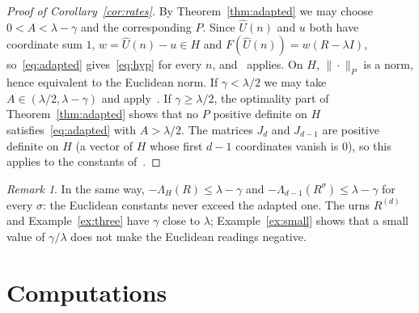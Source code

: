 \documentclass[11pt]{amsart}
\theoremstyle{definition}
\theoremstyle{remark}
\newtheorem{remark}[theorem]{Remark}
\begin{document}
\begin{proof}[Proof of Corollary~\ref{cor:rates}]
By Theorem~\ref{thm:adapted} we may choose $0<A<\lambda-\gamma$ and the corresponding $P$. Since $\widehat U(n)$ and $u$ both have coordinate sum $1$, $w=\widehat U(n)-u\in H$ and $F(\widehat U(n))=w(R-\lambda I)$, so~\eqref{eq:adapted} gives~\eqref{eq:hyp} for every $n$, and~\cite[Theorem~3.2]{NP} applies. On $H$, $\|\cdot\|_P$ is a norm, hence equivalent to the Euclidean norm. If $\gamma<\lambda/2$ we may take $A\in(\lambda/2,\lambda-\gamma)$ and apply~\cite[Theorem~3.3]{NP}. If $\gamma\ge\lambda/2$, the optimality part of Theorem~\ref{thm:adapted} shows that no $P$ positive definite on $H$ satisfies~\eqref{eq:adapted} with $A>\lambda/2$. The matrices $J_d$ and $J_{d-1}$ are positive definite on $H$ (a vector of $H$ whose first $d-1$ coordinates vanish is $0$), so this applies to the constants of~\cite[Proposition~3.6]{NP}.
\end{proof}

\begin{remark}
In the same way, $-\Lambda_H(R)\le\lambda-\gamma$ and $-\Lambda_{d-1}(R^\sigma)\le\lambda-\gamma$ for every $\sigma$: the Euclidean constants never exceed the adapted one. The urns $R^{(d)}$ and Example~\ref{ex:three} have $\gamma$ close to $\lambda$; Example~\ref{ex:small} shows that a small value of $\gamma/\lambda$ does not make the Euclidean readings negative.
\end{remark}

\section{Computations}\label{sec:comp}
\end{document}
